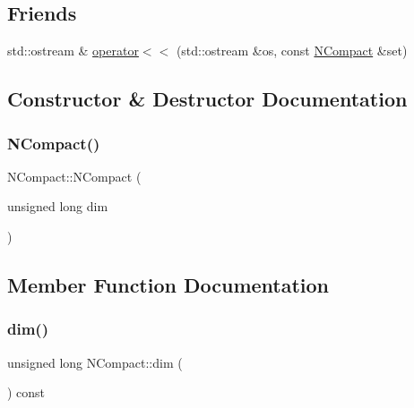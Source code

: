 \subsection*{Friends}
\begin{DoxyCompactItemize}
\item 
std\+::ostream \& \mbox{\hyperlink{class_n_compact_a2afd0750c38a42e4afdc675fb8ac0221}{operator$<$$<$}} (std\+::ostream \&os, const \mbox{\hyperlink{class_n_compact}{N\+Compact}} \&set)
\end{DoxyCompactItemize}


\subsection{Constructor \& Destructor Documentation}
\mbox{\label{class_n_compact_adca59e9cffb585724a81bb3fa6cc735f}} 
\subsubsection{\texorpdfstring{NCompact()}{NCompact()}}
{\footnotesize\ttfamily N\+Compact\+::\+N\+Compact (\begin{DoxyParamCaption}\item[{unsigned long}]{dim }\end{DoxyParamCaption})}



\subsection{Member Function Documentation}
\mbox{\label{class_n_compact_a795625c0eda03eb2e113b125948224b0}} 
\subsubsection{\texorpdfstring{dim()}{dim()}}
{\footnotesize\ttfamily unsigned long N\+Compact\+::dim (\begin{DoxyParamCaption}{ }\end{DoxyParamCaption}) const}

\mbox{\label{class_n_compact_af1879d7342bf6d9902ed5473f6e89038}} 
